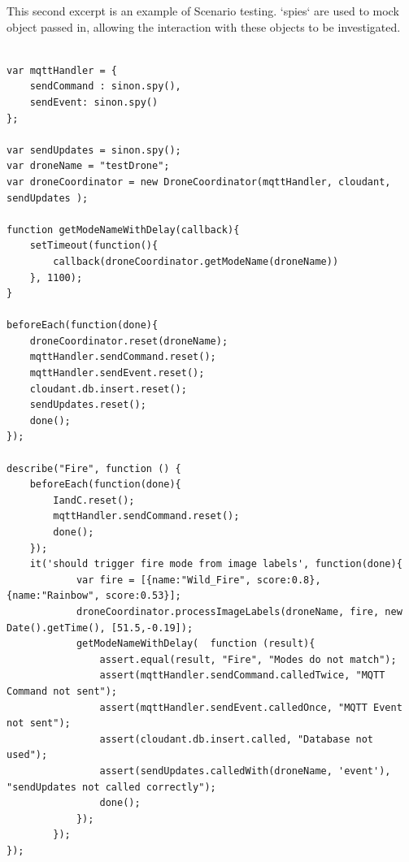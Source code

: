 \documentclass{article}
\begin{document}
This second excerpt is an example of Scenario testing. `spies` are used to mock object passed in, allowing the interaction with these objects to be investigated. 
\begin{lstlisting}[label=mocha2]

var mqttHandler = {
	sendCommand : sinon.spy(),
	sendEvent: sinon.spy()
};

var sendUpdates = sinon.spy();
var droneName = "testDrone";
var droneCoordinator = new DroneCoordinator(mqttHandler, cloudant, sendUpdates );

function getModeNameWithDelay(callback){
	setTimeout(function(){
		callback(droneCoordinator.getModeName(droneName))
	}, 1100);
}

beforeEach(function(done){
	droneCoordinator.reset(droneName);
	mqttHandler.sendCommand.reset();
	mqttHandler.sendEvent.reset();
	cloudant.db.insert.reset();
	sendUpdates.reset();
	done();
});

describe("Fire", function () {
	beforeEach(function(done){
		IandC.reset();
		mqttHandler.sendCommand.reset();
		done();
	});
	it('should trigger fire mode from image labels', function(done){
            var fire = [{name:"Wild_Fire", score:0.8}, {name:"Rainbow", score:0.53}];
            droneCoordinator.processImageLabels(droneName, fire, new Date().getTime(), [51.5,-0.19]);
            getModeNameWithDelay(  function (result){
                assert.equal(result, "Fire", "Modes do not match");
                assert(mqttHandler.sendCommand.calledTwice, "MQTT Command not sent");
                assert(mqttHandler.sendEvent.calledOnce, "MQTT Event not sent");
                assert(cloudant.db.insert.called, "Database not used");
                assert(sendUpdates.calledWith(droneName, 'event'), "sendUpdates not called correctly");
                done();
            });
        });
});
\end{lstlisting} 
\end{document}
